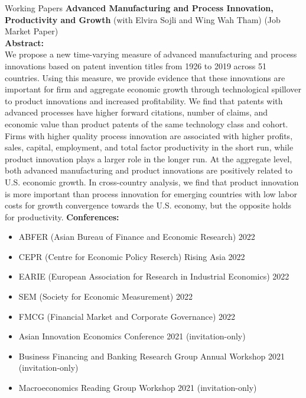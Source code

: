 \documentclass{resume} %
\begin{document}
\begin{rSection}{Working Papers}
	{\bf Advanced Manufacturing and Process Innovation, Productivity and Growth} (with Elvira Sojli and Wing Wah Tham) (Job Market Paper)\\
	{\bf Abstract:}\\
	We propose a new time-varying measure of advanced manufacturing and process innovations based on patent invention titles from 1926 to 2019 across 51 countries. Using this measure, we provide evidence that these innovations are important for firm and aggregate economic growth through technological spillover to product innovations and increased profitability. We find that patents with advanced processes have higher forward citations, number of claims, and economic value than product patents of the same technology class and cohort. Firms with higher quality process innovation are associated with higher profits, sales, capital, employment, and total factor productivity in the short run, while product innovation plays a larger role in the longer run. At the aggregate level, both advanced manufacturing and product innovations are positively related to U.S. economic growth. In cross-country analysis, we find that product innovation is more important than process innovation for emerging countries with low labor costs for growth convergence towards the U.S. economy, but the opposite holds for productivity.
		{\bf Conferences:}
	\begin{itemize}
		\item ABFER (Asian Bureau of Finance and Economic Research) 2022
		\item CEPR (Centre for Economic Policy Reserch) Rising Asia 2022
		\item EARIE (European Association for Research in Industrial Economics) 2022
		\item SEM (Society for Economic Measurement) 2022
		\item FMCG (Financial Market and Corporate Governance) 2022
		\item Asian Innovation Economics Conference 2021 (invitation-only)
		\item Business Financing and Banking Research Group Annual Workshop 2021 (invitation-only)
		\item Macroeconomics Reading Group Workshop 2021 (invitation-only)
	\end{itemize}


\end{rSection}
\end{document}

